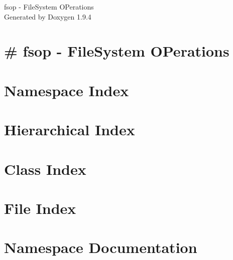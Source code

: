 \documentclass[twoside]{book}
\newcommand{\+}{\discretionary{\mbox{\scriptsize$\hookleftarrow$}}{}{}}
\newcommand{\clearemptydoublepage}{%
    \newpage{\pagestyle{empty}\cleardoublepage}%
  }
\begin{document}
  \raggedbottom
    \hypersetup{pageanchor=false,
                bookmarksnumbered=true,
                pdfencoding=unicode
               }
  \begin{titlepage}
  \vspace*{7cm}
  \begin{center}%
  {\Large fsop -\/ File\+System OPerations}\\
  \vspace*{1cm}
  {\large Generated by Doxygen 1.9.4}\\
  \end{center}
  \end{titlepage}
  \clearemptydoublepage
  \tableofcontents
  \clearemptydoublepage
  \hypersetup{pageanchor=true}
\chapter{\# fsop -\/ File\+System OPerations}
\label{index}\hypertarget{index}{}
\chapter{Namespace Index}

\chapter{Hierarchical Index}

\chapter{Class Index}

\chapter{File Index}

\chapter{Namespace Documentation}








\end{document}
